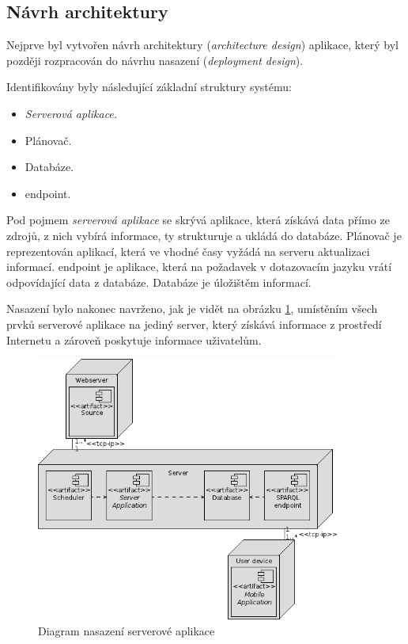 \subsection{Návrh architektury}
Nejprve byl vytvořen návrh architektury (\textit{architecture design}) aplikace, který byl později rozpracován do návrhu nasazení (\textit{deployment design}).

Identifikovány byly následující základní struktury systému:
\begin{itemize}
 \item \textit{Serverová aplikace.}
 \item Plánovač.
 \item Databáze.
 \item {} endpoint.
\end{itemize}
Pod pojmem \textit{serverová aplikace} se skrývá aplikace, která získává data přímo ze zdrojů, z nich vybírá informace, ty strukturuje a ukládá do databáze. Plánovač je reprezentován aplikací, která ve vhodné časy vyžádá na serveru aktualizaci informací.  endpoint je aplikace, která na požadavek v dotazovacím jazyku vrátí odpovídající data z databáze. Databáze je úložištěm informací.

Nasazení bylo nakonec navrženo, jak je vidět na obrázku \ref{fig:server:deployment}, umístěním všech prvků serverové aplikace na jediný server, který získává informace z prostředí Internetu a zároveň poskytuje informace uživatelům.
\begin{figure}[h]
 \centering
 \includegraphics[width=10cm]{./figures/deployment-s.png}
 \caption{Diagram nasazení serverové aplikace}
 \label{fig:server:deployment}
\end{figure}


